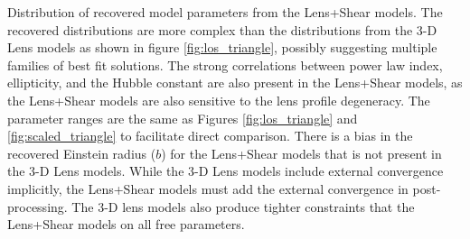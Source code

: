 \label{fig:shear_triangle} Distribution of recovered model parameters from the Lens+Shear models. The recovered distributions are more complex than the distributions from the 3-D Lens models as shown in figure \ref{fig:los_triangle}, possibly suggesting multiple families of best fit solutions. The strong correlations between power law index, ellipticity, and the Hubble constant are also present in the Lens+Shear models, as the Lens+Shear models are also sensitive to the lens profile degeneracy. The parameter ranges are the same as Figures \ref{fig:los_triangle} and \ref{fig:scaled_triangle} to facilitate direct comparison. There is a bias in the recovered Einstein radius ($b$) for the Lens+Shear models that is not present in the 3-D Lens models. While the 3-D Lens models include external convergence implicitly, the Lens+Shear models must add the external convergence in post-processing. The 3-D lens models also produce tighter constraints that the Lens+Shear models on all free parameters.